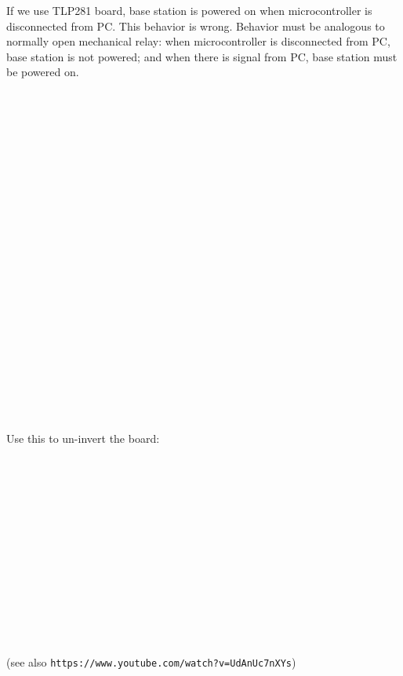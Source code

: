 \nopagenumbers
If we use TLP281 board, base station is powered on when microcontroller is disconnected from PC.
This behavior is wrong. Behavior must be analogous to normally open mechanical relay: when
microcontroller is disconnected from PC, base station is not powered; and when
there is signal from PC, base station must be powered on.
$$\hbox to16cm{\vbox to5.82cm{\vfil\special{psfile=tlp2.eps
  clip llx=0 lly=0 urx=863 ury=314 rwi=4535}}\hfil}$$
$$\hbox to15.38cm{\vbox to7.26722222222222cm{\vfil\special{psfile=tlp1.eps
  clip llx=0 lly=0 urx=436 ury=206 rwi=4360}}\hfil}$$
Use this to un-invert the board:
$$\hbox to7.26cm{\vbox to6.24416666666667cm{\vfil\special{psfile=TLP281.1
  clip llx=-91 lly=-43 urx=115 ury=134 rwi=2060}}\hfil}$$
\vfil
(see also {\tt https://www.youtube.com/watch?v=UdAnUc7nXYs})
\bye
